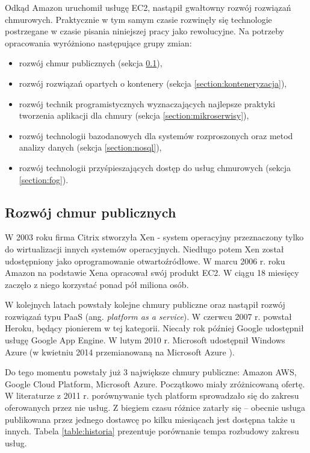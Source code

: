 \documentclass[12pt,a4paper,twoside,titlepage,openright]{book}
\begin{document}
Odkąd Amazon uruchomił usługę EC2, nastąpił gwałtowny rozwój rozwiązań chmurowych. Praktycznie w tym samym czasie rozwinęły się technologie postrzegane w czasie pisania niniejszej pracy jako rewolucyjne. Na potrzeby opracowania wyróżniono następujące grupy zmian:
\begin{itemize}
\item rozwój chmur publicznych (sekcja \ref{section:chmuryPubliczne}),
\item rozwój rozwiązań opartych o kontenery (sekcja \ref{section:konteneryzacja}),
\item rozwój technik programistycznych wyznaczających najlepsze praktyki tworzenia aplikacji dla chmury (sekcja \ref{section:mikroserwisy}),
\item rozwój technologii bazodanowych dla systemów rozproszonych oraz metod analizy danych (sekcja \ref{section:nosql}),
\item rozwój technologii przyśpieszających dostęp do usług chmurowych (sekcja \ref{section:fog}).
\end{itemize}

\subsection{Rozwój chmur publicznych} \label{section:chmuryPubliczne}

W 2003 roku firma Citrix stworzyła Xen - system operacyjny przeznaczony tylko do wirtualizacji innych systemów operacyjnych. Niedługo potem Xen został udostępniony jako oprogramowanie otwartoźródłowe. W marcu 2006 r. roku Amazon na podstawie Xena opracował swój produkt EC2. W ciągu 18 miesięcy zaczęło z niego korzystać ponad pół miliona osób.\cite{ccBiznes}

W kolejnych latach powstały kolejne chmury publiczne oraz nastąpił rozwój rozwiązań typu PaaS (ang. \textit{platform as a service}). W czerwcu 2007 r. powstał Heroku, będący pionierem w tej kategorii. Niecały rok później Google udostępnił usługę Google App Engine. W lutym 2010 r. Microsoft udostępnił Windows Azure (w kwietniu 2014 przemianowaną na Microsoft Azure \cite{azurePackt}).

Do tego momentu powstały już 3 największe chmury publiczne: Amazon AWS, Google Cloud Platform, Microsoft Azure. Początkowo miały zróżnicowaną ofertę. W literaturze\cite{ccBiznes} z 2011 r. porównywanie tych platform sprowadzało się do zakresu oferowanych przez nie usług. Z biegiem czasu różnice zatarły się -- obecnie usługa publikowana przez jednego dostawcę po kilku miesiącach jest dostępna także u innych. Tabela \ref{table:historia} prezentuje porównanie tempa rozbudowy zakresu usług.
\end{document}
